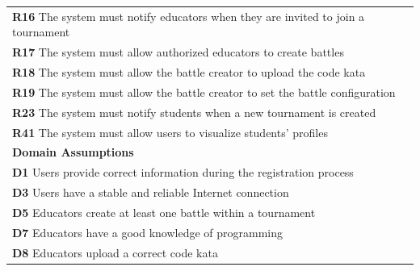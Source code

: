 \begin{table}[H]
\begin{tabularx}{\textwidth}{X}
        \textbf{R16} The system must notify educators when they are invited to join a tournament      \\
        \textbf{R17} The system must allow authorized educators to create battles        \\ 
        \textbf{R18} The system must allow the battle creator to upload the code kata       \\
        \textbf{R19} The system must allow the battle creator to set the battle configuration       \\ 
        \textbf{R23} The system must notify students when a new tournament is created            \\
        \textbf{R41} The system must allow users to visualize students' profiles     \\
        \midrule
        \textbf{Domain Assumptions}                                                                                                  \\ \midrule
        \textbf{D1} Users provide correct information during the registration process \\   
        \textbf{D3} Users have a stable and reliable Internet connection \\
        \textbf{D5} Educators create at least one battle within a tournament        \\
        \textbf{D7} Educators have a good knowledge of programming      \\
        \textbf{D8} Educators upload a correct code kata        \\
        \bottomrule
    \end{tabularx}
\end{table}

